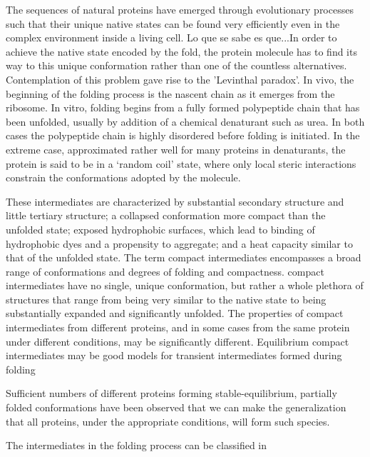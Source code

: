 The sequences of natural proteins have emerged through evolutionary processes such that their unique native states can be found very efficiently even in the complex environment inside a living cell.
Lo que se sabe es que...In order to achieve the native state encoded by the fold, the protein molecule has to find its way to this unique conformation rather than one of the countless alternatives. 
Contemplation of this problem gave rise to the 'Levinthal paradox'. 
In vivo, the beginning of the folding process is the nascent chain as it emerges from the ribosome. 
In vitro, folding begins from a fully formed polypeptide chain that has been unfolded, usually by addition of a chemical denaturant such as urea. 
In both cases the polypeptide chain is highly disordered before folding is initiated. 
In the extreme case, approximated rather well for many proteins in denaturants, the protein is said to be in a `random coil' state, where only local steric interactions constrain the conformations adopted by the molecule.



These intermediates are characterized by substantial secondary structure and little tertiary
structure; a collapsed conformation more compact than the unfolded state; exposed hydrophobic surfaces, 
which lead to binding of hydrophobic dyes
and a propensity to aggregate; 
and a heat capacity similar
to that of the unfolded state. 
The term compact intermediates
encompasses a broad range of conformations
and degrees of
folding and compactness.
compact intermediates have no single, unique conformation, but rather a whole plethora of structures that range from being very
similar to the native state to being substantially expanded and significantly unfolded. 
The properties of compact intermediates from different proteins, and in some cases from the same protein under different conditions, may be significantly different. 
Equilibrium compact intermediates may be good models for transient intermediates formed during folding

Sufficient numbers of different proteins forming stable-equilibrium, partially folded conformations have been observed that we can
make the generalization that all proteins, under the appropriate conditions, will form such species.


The intermediates in the folding process can be classified in



